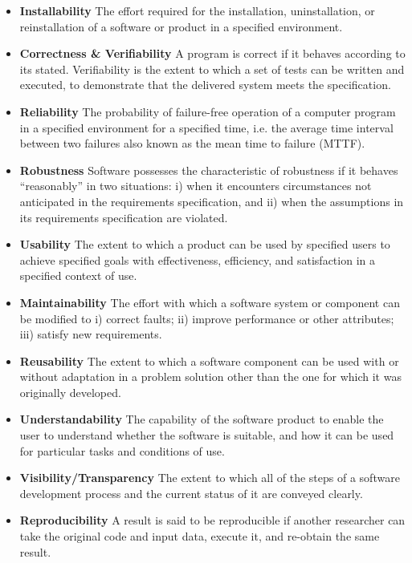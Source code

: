\begin{itemize}
	\label{def_installability}
	\item \textbf{Installability} The effort required for the installation, uninstallation, or reinstallation of a software or product in a specified environment.
	\label{def_correctness_verifiability}
	\item \textbf{Correctness \& Verifiability} A program is correct if it behaves according to its stated. Verifiability is the extent to which a set of tests can be written and executed, to demonstrate that the delivered system meets the specification.
	\label{def_reliability}
	\item \textbf{Reliability} The probability of failure-free operation of a computer program in a specified environment for a specified time, i.e. the average time interval between two failures also known as the mean time to failure (MTTF).
	\label{def_robustness}
	\item \textbf{Robustness} Software possesses the characteristic of robustness if it behaves ``reasonably'' in two situations: i) when it encounters circumstances not anticipated in the requirements specification, and ii) when the assumptions in its requirements specification are violated.
	\label{def_usability}
	\item \textbf{Usability} The extent to which a product can be used by specified users to achieve specified goals with effectiveness, efficiency, and satisfaction in a specified context of use.
	\label{def_maintainability}
	\item \textbf{Maintainability} The effort with which a software system or component can be modified to i) correct faults; ii) improve performance or other attributes; iii) satisfy new requirements.
	\label{def_reusability}
	\item \textbf{Reusability} The extent to which a software component can be used with or without adaptation in a problem solution other than the one for which it was originally developed.
	\label{def_understandability}
	\item \textbf{Understandability} The capability of the software product to enable the user to understand whether the software is suitable, and how it can be used for particular tasks and conditions of use.
	\label{def_visibility_transparency}
	\item \textbf{Visibility/Transparency} The extent to which all of the steps of a software development process and the current status of it are conveyed clearly.
	\label{def_reproducibility}
	\item \textbf{Reproducibility} A result is said to be reproducible if another researcher can take the original code and input data, execute it, and re-obtain the same result.
\end{itemize}


